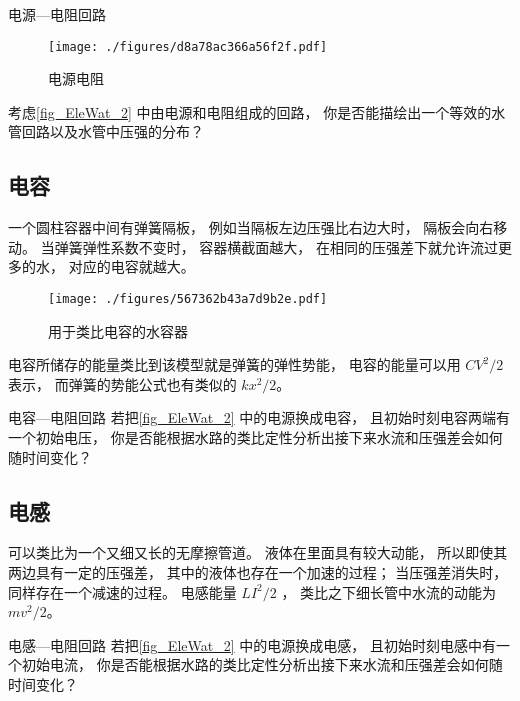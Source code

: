 \begin{exercise}{电源—电阻回路}
\begin{figure}[ht]
\centering
\texttt{[image: ./figures/d8a78ac366a56f2f.pdf]}
\caption{电源电阻} \label{fig_EleWat_2}
\end{figure}
考虑\autoref{fig_EleWat_2} 中由电源和电阻组成的回路， 你是否能描绘出一个等效的水管回路以及水管中压强的分布？
\end{exercise}

\subsection{电容}
一个圆柱容器中间有弹簧隔板， 例如当隔板左边压强比右边大时， 隔板会向右移动。 当弹簧弹性系数不变时， 容器横截面越大， 在相同的压强差下就允许流过更多的水， 对应的电容就越大。
\begin{figure}[ht]
\centering
\texttt{[image: ./figures/567362b43a7d9b2e.pdf]}
\caption{用于类比电容的水容器} \label{fig_EleWat_1}
\end{figure}

电容所储存的能量类比到该模型就是弹簧的弹性势能， 电容的能量可以用 $CV^2/2$ 表示， 而弹簧的势能公式也有类似的 $kx^2/2$。

\begin{exercise}{电容—电阻回路}\label{exe_EleWat_1}
若把\autoref{fig_EleWat_2} 中的电源换成电容， 且初始时刻电容两端有一个初始电压， 你是否能根据水路的类比定性分析出接下来水流和压强差会如何随时间变化？
\end{exercise}

\subsection{电感}
可以类比为一个又细又长的无摩擦管道。 液体在里面具有较大动能， 所以即使其两边具有一定的压强差， 其中的液体也存在一个加速的过程； 当压强差消失时， 同样存在一个减速的过程。 电感能量 $LI^2/2$ ， 类比之下细长管中水流的动能为 $mv^2/2$。


\begin{exercise}{电感—电阻回路}
若把\autoref{fig_EleWat_2} 中的电源换成电感， 且初始时刻电感中有一个初始电流， 你是否能根据水路的类比定性分析出接下来水流和压强差会如何随时间变化？
\end{exercise}
